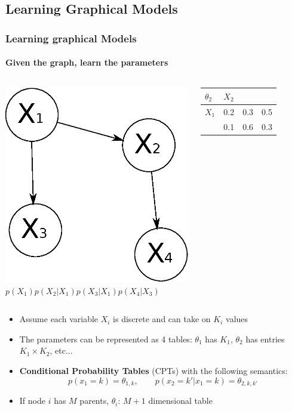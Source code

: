 \documentclass[slidestop,compress,mathserif]{beamer}
\begin{document}
\subsection{Learning Graphical Models}

\begin{frame}
	\frametitle{Learning graphical Models}
    \framesubtitle{Given the graph, learn the parameters}
	\vspace{-.3cm}
	\begin{columns}[T]
	 \includegraphics[width=\textwidth]{g2}
	 $p(X_1)p(X_2|X_1)p(X_3|X_1)p(X_4|X_3)$
	 \begin{table}[!h]
	\begin{tabular}{|l|l|l|l|}
	\hline
	$\theta_2$ & \multicolumn{3}{l|}{$X_2$} \\ \hline
	$X_1$      & 0.2     & 0.3     & 0.5    \\ \hline
	           & 0.1     & 0.6     & 0.3    \\ \hline
	\end{tabular}
	\end{table}
	\par
	\end{columns}
	\small
	\begin{itemize}[<+->]
	\item Assume each variable $X_i$ is discrete and can take on $K_i$ values
	\item The parameters can be represented as 4 tables: $\theta_1$ has $K_1$, $\theta_2$ has entries $K_1\times K_2$, etc...
	\item \textbf{Conditional Probability Tables} (CPTs) with the following semantics:
	$$p(x_1 = k) = \theta_{1,k}, \qquad p(x_2=k'| x_1 = k)	 = \theta_{2,k,k'}$$
	\item
	If node $i$ has $M$ parents, $\theta_i$:
	$M+1$ dimensional table
	

\end{itemize}
\end{frame}
\end{document}
